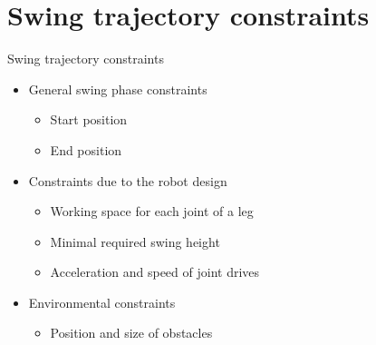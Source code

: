 \documentclass[11pt]{beamer}
\begin{document}
\section{Swing trajectory constraints}
\begin{frame}{Swing trajectory constraints}
\begin{itemize}
	\item General swing phase constraints
	\begin{itemize}
		\item Start position
		\item End position
	\end{itemize}
	\pause
	\item Constraints due to the robot design
	\begin{itemize}
		\item Working space for each joint of a leg
		\item Minimal required swing height
		\item Acceleration and speed of joint drives
	\end{itemize}
	\pause
	\item Environmental constraints
	\begin{itemize}
		\item Position and size of obstacles
	\end{itemize}
\end{itemize}
\end{frame}
\end{document}
